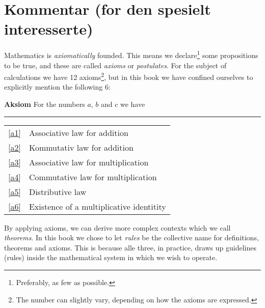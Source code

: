 



	
\section*{Kommentar (for den spesielt interesserte) \label{Kommentar1}}
Mathematics is \textit{axiomatically} founded. This means we declare\footnote{Preferably, as few as possible.} some propositions to be true, and these are called \textit{axioms} or \textit{postulates}. For the subject of calculations we have 12 axioms\footnote{The number can slightly vary, depending on how the axioms are expressed.}, but in this book we have confined ourselves to explicitly mention the following 6:
\regv 

\begin{tcolorbox}[boxrule=0.3 mm,arc=0mm,colback=blue!5] {\large \textbf{Aksiom} \vspace{5 pt}}\newline
For the numbers $ a $, $ b $ and $ c $ we have
\rule{1\linewidth}{0.75bp}
\begin{center}
	\begin{tabular}{rl}
		\eqref{a1} &Associative law for addition\\
		\eqref{a2} & Kommutativ law for addition \\	
		\eqref{a3} & Associative law for multiplication \\
		\eqref{a4} & Commutative law for multiplication \\		
		\eqref{a5} & Distributive law\\	
		\eqref{a6} & Existence of a multiplicative identitity
	\end{tabular}
\end{center}
\end{tcolorbox}
\vsk
By applying axioms, we can derive more complex contexts which we call \textit{theorems}. In this book we chose to let \textsl{rules} be the collective name for definitions, theorems and axioms. This is because alle three, in practice, draws up guidelines (rules) inside the mathematical system in which we wish to operate.\vsk

